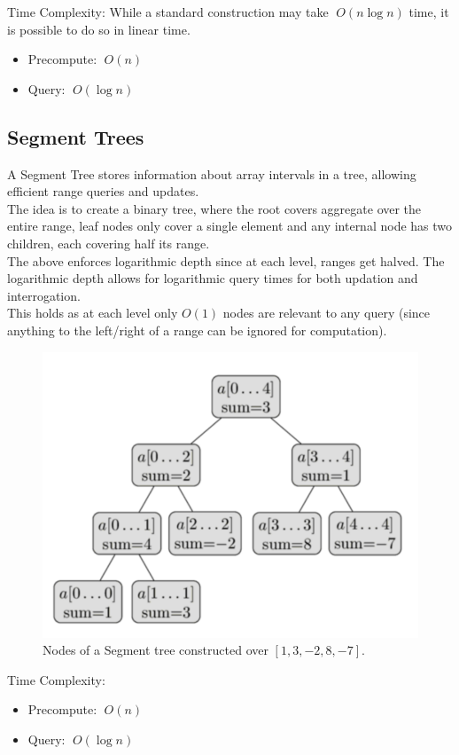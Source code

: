 \documentclass[12pt]{article}
\begin{document}
Time Complexity:
While a standard construction may take $\;O(n\log n)$ time, it is possible to do so in linear time.
\begin{itemize}
  \item Precompute: $\;O(n)$
  \item Query: $\;O(\log n)$
\end{itemize}

\subsection{Segment Trees\cite{segment_tree_cp}}
A Segment Tree stores information about array intervals in a tree, allowing efficient range queries and updates. \\
The idea is to create a binary tree, where the root covers aggregate over the entire range, leaf nodes only cover a single element and any internal node has two children, each covering half its range. \\
The above enforces logarithmic depth since at each level, ranges get halved. The logarithmic depth allows for logarithmic query times for both updation and interrogation. \\
This holds as at each level only $O(1)$ nodes are relevant to any query (since anything to the left/right of a range can be ignored for computation).

\begin{figure}[H]
  \centering
  \includegraphics[width=0.7\linewidth]{segtree.png}
  \caption{Nodes of a Segment tree constructed over $[1, 3, -2, 8, -7]$.\cite{segment_tree_cp}}
\end{figure}

Time Complexity:
\begin{itemize}
  \item Precompute: $\;O(n)$
  \item Query: $\;O(\log n)$
\end{itemize}
\end{document}
